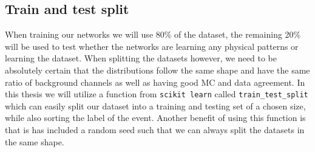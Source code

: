 \documentclass[12pt, a4paper]{book}
\begin{document}
\subsection{Train and test split}\label{sec:train_test}
When training our networks we will use 80\% of the dataset, the remaining 20\% will be used to test whether the networks are learning any physical patterns or learning the dataset. When splitting the datasets however, we need to be absolutely certain that the distributions 
follow the same shape and have the same ratio of background channels as well as having good MC and data agreement. In this thesis we will utilize a function from \verb|scikit learn| \cite{scikit-learn} called \verb|train_test_split| which can easily split our dataset into 
a training and testing set of a chosen size, while also sorting the label of the event. Another benefit of using this function is that is has included a random seed such that we can always split the datasets in the same shape.
\graphicspath{{../../../Plots/Data_Analysis/train_test_split/}}
\end{document}
